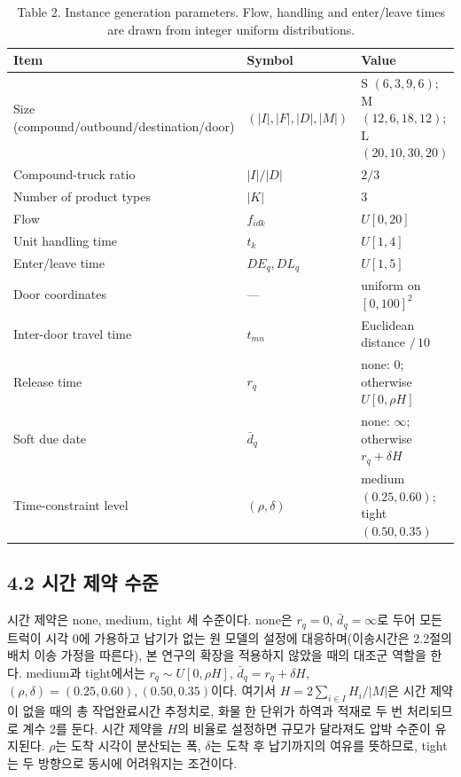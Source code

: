 \documentclass[10pt,a4paper]{article}
\begin{document}
\begin{table}[H]\centering
\caption{Table 2. Instance generation parameters. Flow, handling and
enter/leave times are drawn from integer uniform distributions.}
\label{tab:param}\small\setlength{\tabcolsep}{4pt}
\begin{tabular}{@{}llp{}@{}}
\toprule
Item & Symbol & Value \\
\midrule
Size (compound/outbound/destination/door) & $(|I|,|F|,|D|,|M|)$ & S $(6,3,9,6)$; M $(12,6,18,12)$; L $(20,10,30,20)$ \\
Compound-truck ratio & $|I|/|D|$ & $2/3$ \\
Number of product types & $|K|$ & 3 \\
Flow & $f_{idk}$ & $U[0,20]$ \\
Unit handling time & $t_k$ & $U[1,4]$ \\
Enter/leave time & $DE_q,DL_q$ & $U[1,5]$ \\
Door coordinates & --- & uniform on $[0,100]^2$ \\
Inter-door travel time & $t_{mn}$ & Euclidean distance $/\,10$ \\
Release time & $r_q$ & none: $0$; otherwise $U[0,\rho H]$ \\
Soft due date & $\bar d_q$ & none: $\infty$; otherwise $r_q+\delta H$ \\
Time-constraint level & $(\rho,\delta)$ & medium $(0.25,0.60)$; tight $(0.50,0.35)$ \\
\bottomrule
\end{tabular}
\end{table}

\subsection{4.2 시간 제약 수준}
시간 제약은 none, medium, tight 세 수준이다. none은 $r_q=0$, $\bar d_q=\infty$로 두어
모든 트럭이 시각 0에 가용하고 납기가 없는 원 모델의 설정에 대응하며(이송시간은 2.2절의 배치 이송 가정을 따른다), 본 연구의 확장을 적용하지 않았을 때의
대조군 역할을 한다. medium과 tight에서는 $r_q\sim U[0,\rho H]$, $\bar d_q=r_q+\delta H$,
$(\rho,\delta)=(0.25,0.60),(0.50,0.35)$이다. 여기서 $H=2\sum_{i\in I}H_i/|M|$은 시간
제약이 없을 때의 총 작업완료시간 추정치로, 화물 한 단위가 하역과 적재로 두 번 처리되므로
계수 2를 둔다. 시간 제약을 $H$의 비율로 설정하면 규모가 달라져도 압박 수준이 유지된다.
$\rho$는 도착 시각이 분산되는 폭, $\delta$는 도착 후 납기까지의 여유를 뜻하므로, tight는 두
방향으로 동시에 어려워지는 조건이다.
\end{document}
